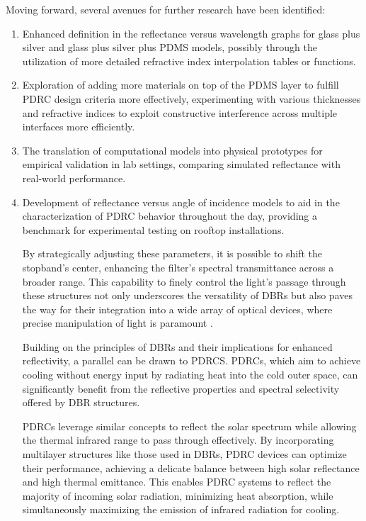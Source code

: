 Moving forward, several avenues for further research have been identified:

\begin{enumerate}
    \item Enhanced definition in the reflectance versus wavelength graphs for glass plus silver and glass plus silver plus PDMS models, possibly through the utilization of more detailed refractive index interpolation tables or functions.
    \item Exploration of adding more materials on top of the PDMS layer to fulfill PDRC design criteria more effectively, experimenting with various thicknesses and refractive indices to exploit constructive interference across multiple interfaces more efficiently.
    \item The translation of computational models into physical prototypes for empirical validation in lab settings, comparing simulated reflectance with real-world performance.
    \item Development of reflectance versus angle of incidence models to aid in the characterization of PDRC behavior throughout the day, providing a benchmark for experimental testing on rooftop installations.



By strategically adjusting these parameters, it is possible to shift the stopband's center, enhancing the filter's spectral transmittance across a broader range. This capability to finely control the light's passage through these structures not only underscores the versatility of DBRs but also paves the way for their integration into a wide array of optical devices, where precise manipulation of light is paramount \cite{pedrotti_introduction_2007}.

Building on the principles of DBRs and their implications for enhanced reflectivity, a parallel can be drawn to PDRCS. PDRCs, which aim to achieve cooling without energy input by radiating heat into the cold outer space, can significantly benefit from the reflective properties and spectral selectivity offered by DBR structures.

PDRCs leverage similar concepts to reflect the solar spectrum while allowing the thermal infrared range to pass through effectively. By incorporating multilayer structures like those used in DBRs, PDRC devices can optimize their performance, achieving a delicate balance between high solar reflectance and high thermal emittance. This enables PDRC systems to reflect the majority of incoming solar radiation, minimizing heat absorption, while simultaneously maximizing the emission of infrared radiation for cooling.
\end{enumerate}


